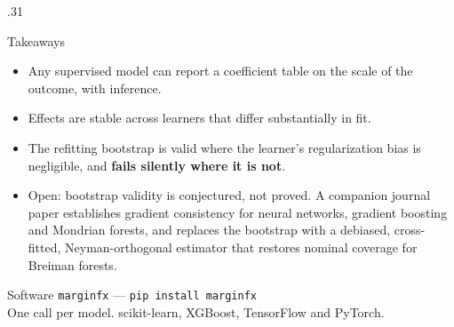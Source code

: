 \documentclass[final]{beamer}
\begin{document}
\begin{frame}[t]
\begin{columns}[t]
\begin{column}{.31\paperwidth}
\begin{block}{Takeaways}
\begin{itemize}
  \item Any supervised model can report a coefficient table on the scale of
        the outcome, with inference.
  \item Effects are stable across learners that differ substantially in fit.
  \item The refitting bootstrap is valid where the learner's regularization
        bias is negligible, and \textbf{fails silently where it is not}.
  \item Open: bootstrap validity is conjectured, not proved. A companion
        journal paper establishes gradient consistency for neural networks,
        gradient boosting and Mondrian forests, and replaces the bootstrap
        with a debiased, cross-fitted, Neyman-orthogonal estimator that
        restores nominal coverage for Breiman forests.
\end{itemize}
\end{block}

\begin{block}{Software}
\centering
\texttt{marginfx} --- \texttt{pip install marginfx}\\[.5ex]
\small One call per model. scikit-learn, XGBoost, TensorFlow and PyTorch.
\end{block}

\end{column}
\end{columns}
\end{frame}
\end{document}
